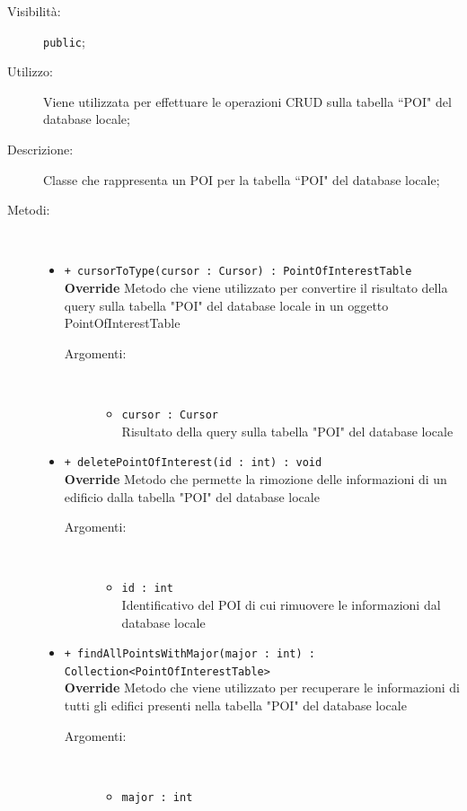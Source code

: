 \documentclass[../DefinizioneDiProdotto.tex]{subfiles}
\begin{document}
\begin{description}
\begin{itemize}
\end{itemize}
\item[Visibilità:] \texttt{public};
\item[Utilizzo:] Viene utilizzata per effettuare le operazioni CRUD sulla tabella “POI" del database locale;
\item[Descrizione:] Classe che rappresenta un POI per la tabella “POI" del database locale;
\item[Metodi:] \
\begin{itemize}
\item \texttt{+ cursorToType(cursor : Cursor) : PointOfInterestTable}\\
\textbf{Override} Metodo che viene utilizzato per convertire il risultato della query sulla tabella "POI" del database locale in un oggetto PointOfInterestTable
 \begin{description}
\item[Argomenti:] \
\begin{itemize}
\item \texttt{cursor : Cursor}\\
Risultato della query sulla tabella "POI" del database locale\end{itemize}
\end{description}
\item \texttt{+ deletePointOfInterest(id : int) : void}\\
\textbf{Override} Metodo che permette la rimozione delle informazioni di un edificio dalla tabella "POI" del database locale 
 \begin{description}
\item[Argomenti:] \
\begin{itemize}
\item \texttt{id : int}\\
Identificativo del POI di cui rimuovere le informazioni dal database locale\end{itemize}
\end{description}
\item \texttt{+ findAllPointsWithMajor(major : int) : Collection<PointOfInterestTable>}\\
\textbf{Override} Metodo che viene utilizzato per recuperare le informazioni di tutti gli edifici presenti nella tabella "POI" del database locale
 \begin{description}
\item[Argomenti:] \
\begin{itemize}
\item \texttt{major : int}\\

\end{itemize}
\end{description}
\end{itemize}
\end{description}
\end{document}
